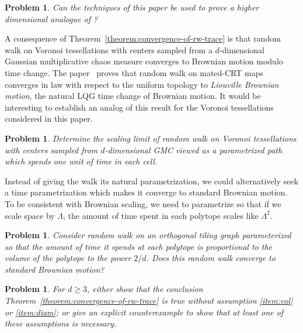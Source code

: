 \documentclass[12pt]{amsart}
\numberwithin{equation}{section}
\newtheorem{problem}[theorem]{Problem}
\begin{document}
\begin{problem} \label{problem:higherdim-invariance}
Can the techniques of this paper be used to prove a higher dimensional analogue of \cite{GMSInvariance}?
\end{problem}




A consequence of Theorem~\ref{theorem:convergence-of-rw-trace} is that random walk on Voronoi tessellations with centers sampled from a $d$-dimensional Gaussian multiplicative chaos measure converges to Brownian motion modulo time change. 
The paper~\cite{GB-LBM} proves that random walk on mated-CRT maps converges in law with respect to the uniform topology to \emph{Liouville Brownian motion}, the natural LQG time change of Brownian motion. It would be interesting to establish an analog of this result for the Voronoi tessellations considered in this paper.  

\begin{problem} \label{problem:convergence-to-lqg}
Determine the scaling limit of random walk on Voronoi tessellations with centers sampled from $d$-dimensional GMC viewed as a parametrized path which spends one unit of time in each cell.
\end{problem}


Instead of giving the walk its natural parametrization, we could alternatively seek a time parametrization which makes it converge to standard Brownian motion. To be consistent with Brownian scaling, we need to parametrize so that if we scale space by $\Lambda$, the amount of time spent in each polytope scales like $\Lambda^{2 }$. 

\begin{problem}
	Consider random walk on an orthogonal tiling graph parameterized so that the amount of time
	it spends at each polytope is proportional to the volume of the polytope to the power $2/d$.
	Does this random walk converge to standard Brownian motion? 
\end{problem}




\begin{problem} \label{problem:hypotheses}
For $d\geq 3$, either show that the conclusion Theorem~\ref{theorem:convergence-of-rw-trace} is true without assumption \ref{item:vol} or \ref{item:diam}; or give an explicit counterexample to show that at least one of these assumptions is necessary. 
\end{problem}
\end{document}
